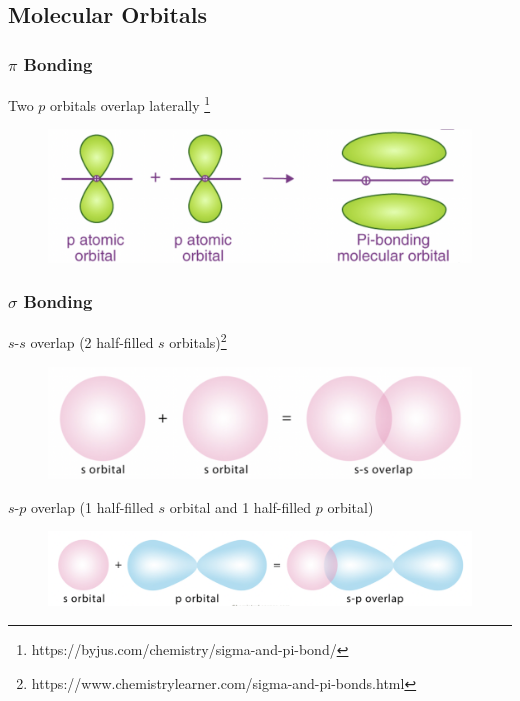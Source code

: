 \documentclass[a4paper, 12pt]{article}
\begin{document}
\subsection{Molecular Orbitals}

\subsubsection{$\pi$ Bonding}

\begin{center}
    Two $p$ orbitals overlap laterally \footnote{https://byjus.com/chemistry/sigma-and-pi-bond/}
\end{center}

\begin{figure}[H]
    \centering
    \includegraphics[width=0.5\linewidth]{pibond.png}
    \label{fig:ahhsfhafhshahahdfhoasdf}
\end{figure}

\subsubsection{$\sigma$ Bonding}

\begin{center}
    $s$-$s$ overlap (2 half-filled $s$ orbitals)\footnote{https://www.chemistrylearner.com/sigma-and-pi-bonds.html}
\end{center}

\begin{figure}[H]
    \centering
    \includegraphics[width=0.45\linewidth]{ssoverlap.png}
    \label{fig:aaaaaaaaaaaaaaaaa}
\end{figure}

\begin{center}
    $s$-$p$ overlap (1 half-filled $s$ orbital and 1 half-filled $p$ orbital)
\end{center}

\begin{figure}[H]
    \centering
    \includegraphics[width=0.5\linewidth]{spoverlap.png}
    \label{fig:enter-label}
\end{figure}
\end{document}
